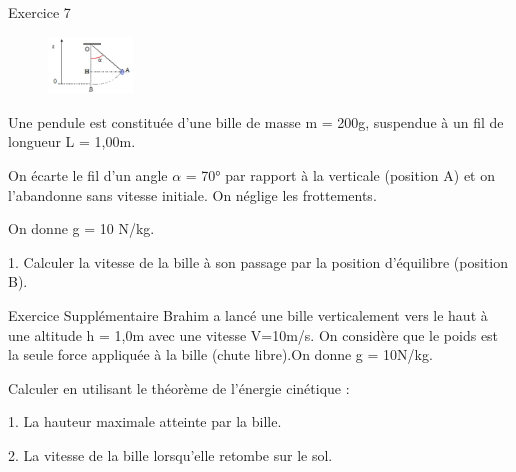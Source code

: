 \documentclass[12pt, french]{article}
\begin{document}
\begin{Box2}{Exercice 7 }
\begin{figure}
  \begin{center}
    \includegraphics[width=0.2\textwidth]{./img/img03.png}
  \end{center}
\end{figure}
Une pendule est constituée d’une bille de
masse m = 200g, suspendue à un fil de
longueur L = 1,00m.

   On écarte le fil d’un angle $\alpha$ = 70° par rapport à la
verticale (position A) et on l’abandonne sans vitesse
initiale. On néglige les frottements.

   On donne g = 10 N/kg.

   1. Calculer la vitesse de la bille à son passage par la position d’équilibre (position B).
\end{Box2}

\begin{Box2}{Exercice Supplémentaire }
Brahim a lancé une bille verticalement vers le haut à une altitude h = 1,0m
avec une vitesse V=10m/s. On considère que le poids est la seule force appliquée à
la bille (chute libre).On donne g = 10N/kg.

   Calculer en utilisant le théorème de l’énergie cinétique :

   1. La hauteur maximale atteinte par la bille.

   2. La vitesse de la bille lorsqu’elle retombe sur le sol.
\end{Box2}


\vspace{2cm}
\begin{center}
   \Large{ \em{}}
\end{center}



\end{document}
